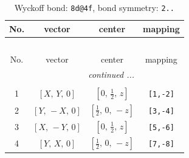 \documentclass[fleqn,8pt]{jsarticle}
\begin{document}
\renewcommand{\arraystretch}{1.2}
\begin{longtable}{cccc}
\caption{Wyckoff bond: {\tt 8d@4f}, bond symmetry: {\tt 2..}}
 \\
 \hline \hline
No. & vector & center & mapping \\ \hline \endfirsthead

\multicolumn{3}{l}{\tablename\ \thetable{}} \\
 \hline \hline
No. & vector & center & mapping \\ \hline \endhead

 \hline \hline
\multicolumn{3}{r}{\footnotesize\it continued ...} \\ \endfoot

 \hline \hline
\multicolumn{3}{r}{} \\ \endlastfoot

1 & $\left[ X,\, Y,\, 0 \right]$ & $\left[ 0,\, \frac{1}{2},\, z \right]$ & {\tt [1,-2]} \\ \hline
2 & $\left[ Y,\, - X,\, 0 \right]$ & $\left[ \frac{1}{2},\, 0,\, - z \right]$ & {\tt [3,-4]} \\ \hline
3 & $\left[ X,\, - Y,\, 0 \right]$ & $\left[ 0,\, \frac{1}{2},\, z \right]$ & {\tt [5,-6]} \\ \hline
4 & $\left[ Y,\, X,\, 0 \right]$ & $\left[ \frac{1}{2},\, 0,\, - z \right]$ & {\tt [7,-8]} \\
\end{longtable}
\renewcommand{\arraystretch}{1.2}
\end{document}
